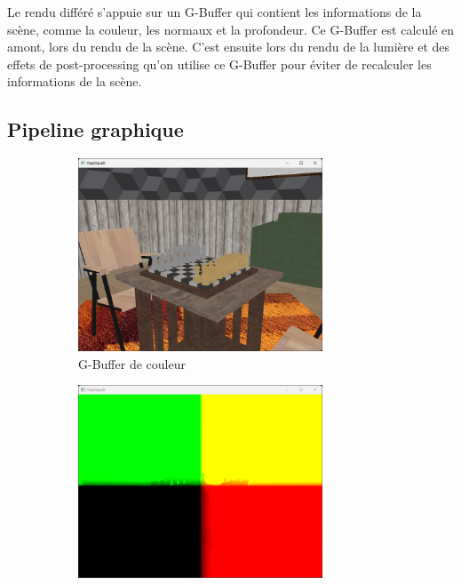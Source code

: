Le rendu différé s'appuie sur un G-Buffer qui contient les informations de la scène,
comme la couleur, les normaux et la profondeur. Ce G-Buffer est calculé en amont, lors
du rendu de la scène. C'est ensuite lors du rendu de la lumière et des effets de
post-processing qu'on utilise ce G-Buffer pour éviter de recalculer les informations de
la scène.
\newpage
\subsection{Pipeline graphique}
    \label{sec:graphics_pipeline}
    \begin{figure}[H]
        \begin{subfigure}{0.5\textwidth}
            \centering
            \includegraphics[width=0.8\textwidth]{images/raptiquax_rendering_gbuffer_albedo.png}
            \caption{G-Buffer de couleur}
            \label{fig:graphics_pipeline_gbuffer_albedo}
        \end{subfigure}
        \begin{subfigure}{0.5\textwidth}
            \centering
            \includegraphics[width=0.8\textwidth]{images/raptiquax_rendering_gbuffer_position.png}

\end{subfigure}
\end{figure}

